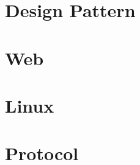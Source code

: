 \documentclass[12pt, oneside, b5paper]{book}
\begin{document}
\part{Design Pattern}


\part{Web}



\part{Linux}



\part{Protocol}


		
\newpage
\end{document}
